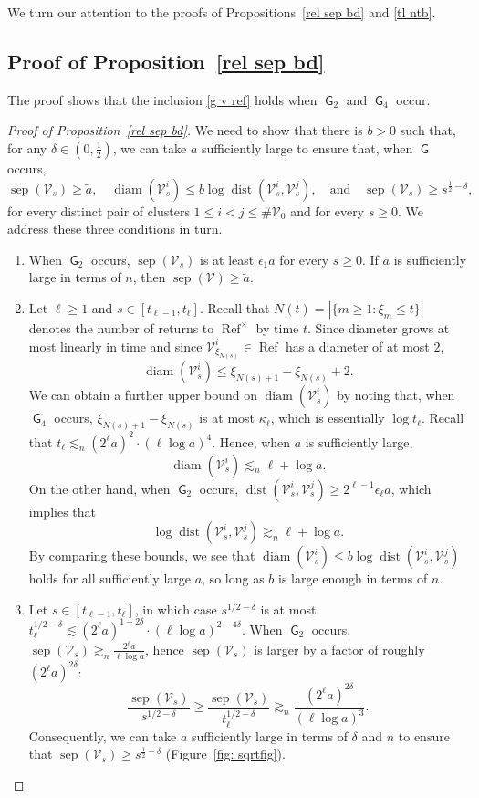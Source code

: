 \documentclass[11pt,reqno]{amsart}
\theoremstyle{definition}
\numberwithin{equation}{section}
\newcommand{\1}{\mathbf{1}}
\newcommand{\eps}{\epsilon}
\DeclareMathOperator{\dist}{dist}
\DeclareMathOperator{\diam}{diam}
\DeclareMathOperator{\sep}{sep}
\DeclareMathOperator{\Refcon}{\mathrm{Ref}}
\DeclareMathOperator{\GG}{\mathsf{G}}
\newcommand{\VV}{\mathcal{V}}
\begin{document}
We turn our attention to the proofs of Propositions~\ref{rel sep bd} and \ref{tl ntb}. 

\subsection{Proof of Proposition~\ref{rel sep bd}}

The proof shows that the inclusion \eqref{g v ref} holds when $\GG_2$ and $\GG_4$ occur.

\begin{proof}[Proof of Proposition~\ref{rel sep bd}]
We need to show that there is $b > 0$ such that, for any $\delta \in (0,\frac12)$, we can take $a$ sufficiently large to ensure that, when $\GG$ occurs, 
\[
\sep (\VV_s) \geq \tilde a, \quad \diam (\VV_s^i) \leq b \log \dist(\VV_s^i, \VV_s^j), \quad \text{and} \quad \sep (\VV_s) \geq s^{\frac12 - \delta},
\]
for every distinct pair of clusters $1 \leq i < j \leq \# \VV_0$ and for every $s \geq 0$. We address these three conditions in turn.

\begin{enumerate}
\item When $\GG_2$ occurs, $\sep (\VV_s)$ is at least $\eps_1 a$ for every $s \geq 0$. If $a$ is sufficiently large in terms of $n$, then $\sep (\VV) \geq \tilde a$.
\item Let $\ell \geq 1$ and $s \in [t_{\ell-1}, t_\ell]$. Recall that $N (t) = |\{m \geq 1: \xi_m \leq t\}|$ denotes the number of returns to $\Refcon^\times$ by time $t$. Since diameter grows at most linearly in time and since $\VV_{\xi_{N(s)}}^i \in \Refcon$ has a diameter of at most $2$,
\begin{equation}\label{xi diam bd}
\diam (\VV_s^i) \leq \xi_{N(s)+1} - \xi_{N(s)} + 2.
\end{equation}
We can obtain a further upper bound on $\diam (\VV_s^i)$ by noting that, when $\GG_4$ occurs, $\xi_{N(s)+1} - \xi_{N(s)}$ is at most $\kappa_\ell$, which is essentially $\log t_\ell$. Recall that $t_\ell \lesssim_n (2^\ell a)^2 \cdot (\ell \log a)^4$. Hence, when $a$ is sufficiently large,
\[
\diam (\VV_s^i) \lesssim_n \ell + \log a.
\]
On the other hand, when $\GG_2$ occurs, $\dist (\VV_s^i, \VV_s^j) \geq 2^{\ell-1} \eps_\ell a$, which implies that
\[
\log \dist(\VV_s^i,\VV_s^j) \gtrsim_n \ell + \log a.
\]
By comparing these bounds, we see that $\diam (\VV_s^i) \leq b \log \dist (\VV_s^i, \VV_s^j)$ holds for all sufficiently large $a$, so long as $b$ is large enough in terms of $n$.
\item Let $s \in [t_{\ell-1},t_\ell]$, in which case $s^{1/2 - \delta}$ is at most $t_\ell^{1/2 - \delta} \lesssim (2^\ell a)^{1-2\delta} \cdot (\ell \log a)^{2-4\delta}$. When $\GG_2$ occurs, $\sep (\VV_s) \gtrsim_n \frac{2^\ell a}{\ell \log a}$, hence $\sep (\VV_s)$ is larger by a factor of roughly $(2^\ell a)^{2\delta}$:
\[
\frac{\sep (\VV_s)}{s^{1/2-\delta}} \geq \frac{\sep (\VV_s)}{t_\ell^{1/2-\delta}} \gtrsim_n \frac{(2^\ell a)^{2\delta}}{(\ell \log a)^3}.
\]
Consequently, we can take $a$ sufficiently large in terms of $\delta$ and $n$ to ensure that $\sep (\VV_s) \geq s^{\frac12 - \delta}$ (Figure~\ref{fig: sqrtfig}).
\end{enumerate} 
\end{proof}
\end{document}

